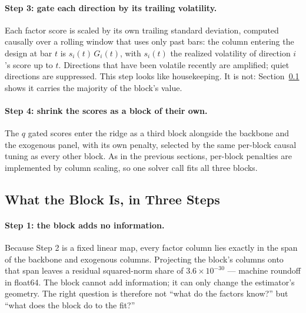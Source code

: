 \paragraph{Step 3: gate each direction by its trailing volatility.}
Each factor score is scaled by its own trailing standard deviation,
computed causally over a rolling window that uses only past bars: the
column entering the design at bar $t$ is $s_i(t)\, G_i(t)$, with $s_i(t)$
the realized volatility of direction $i$'s score up to $t$. Directions
that have been volatile recently are amplified; quiet directions are
suppressed. This step looks like housekeeping. It is not:
Section~\ref{sec:pca_mechanism} shows it carries the majority of the
block's value.

\paragraph{Step 4: shrink the scores as a block of their own.}
The $q$ gated scores enter the ridge as a third block alongside the
backbone and the exogenous panel, with its own penalty, selected by the
same per-block causal tuning as every other block. As in the previous
sections, per-block penalties are implemented by column scaling, so one
solver call fits all three blocks.

\subsection{What the Block Is, in Three Steps}
\label{sec:pca_mechanism}

\paragraph{Step 1: the block adds no information.}
Because Step 2 is a fixed linear map, every factor column lies exactly in
the span of the backbone and exogenous columns. Projecting the block's
columns onto that span leaves a residual squared-norm share of
$3.6 \times 10^{-30}$ --- machine roundoff in float64. The block cannot
add information; it can only change the estimator's geometry. The right
question is therefore not ``what do the factors know?'' but ``what does
the block do to the fit?''

